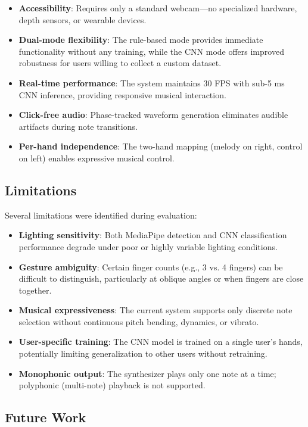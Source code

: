 \documentclass[conference]{IEEEtran}
\begin{document}
\begin{itemize}
\item \textbf{Accessibility}: Requires only a standard webcam---no specialized hardware, depth sensors, or wearable devices.
\item \textbf{Dual-mode flexibility}: The rule-based mode provides immediate functionality without any training, while the CNN mode offers improved robustness for users willing to collect a custom dataset.
\item \textbf{Real-time performance}: The system maintains 30 FPS with sub-5 ms CNN inference, providing responsive musical interaction.
\item \textbf{Click-free audio}: Phase-tracked waveform generation eliminates audible artifacts during note transitions.
\item \textbf{Per-hand independence}: The two-hand mapping (melody on right, control on left) enables expressive musical control.
\end{itemize}

\subsection{Limitations}

Several limitations were identified during evaluation:

\begin{itemize}
\item \textbf{Lighting sensitivity}: Both MediaPipe detection and CNN classification performance degrade under poor or highly variable lighting conditions.
\item \textbf{Gesture ambiguity}: Certain finger counts (e.g., 3 vs. 4 fingers) can be difficult to distinguish, particularly at oblique angles or when fingers are close together.
\item \textbf{Musical expressiveness}: The current system supports only discrete note selection without continuous pitch bending, dynamics, or vibrato.
\item \textbf{User-specific training}: The CNN model is trained on a single user's hands, potentially limiting generalization to other users without retraining.
\item \textbf{Monophonic output}: The synthesizer plays only one note at a time; polyphonic (multi-note) playback is not supported.
\end{itemize}

\subsection{Future Work}
\end{document}
